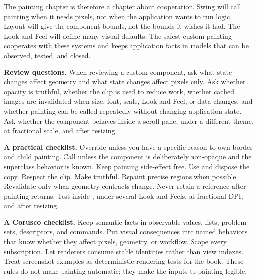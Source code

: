 The painting chapter is therefore a chapter about cooperation. Swing will call painting when it needs pixels, not when the application wants to run logic. Layout will give the component bounds, not the bounds it wishes it had. The Look-and-Feel will define many visual defaults. The safest custom painting cooperates with these systems and keeps application facts in models that can be observed, tested, and closed.

\textbf{Review questions.} When reviewing a custom component, ask what state changes affect geometry and what state changes affect pixels only. Ask whether opacity is truthful, whether the clip is used to reduce work, whether cached images are invalidated when size, font, scale, Look-and-Feel, or data changes, and whether painting can be called repeatedly without changing application state. Ask whether the component behaves inside a scroll pane, under a different theme, at fractional scale, and after resizing.

\textbf{A practical checklist.} Override  unless you have a specific reason to own border and child painting. Call  unless the component is deliberately non-opaque and the superclass behavior is known. Keep painting side-effect free. Use  and dispose the copy. Respect the clip. Make  truthful. Repaint precise regions when possible. Revalidate only when geometry contracts change. Never retain a  reference after painting returns. Test inside , under several Look-and-Feels, at fractional DPI, and after resizing.

\textbf{A Corusco checklist.} Keep semantic facts in observable values, lists, problem sets, descriptors, and commands. Put visual consequences into named behaviors that know whether they affect pixels, geometry, or workflow. Scope every subscription. Let renderers consume stable identities rather than view indexes. Treat screenshot examples as deterministic rendering tests for the book. These rules do not make painting automatic; they make the inputs to painting legible.

